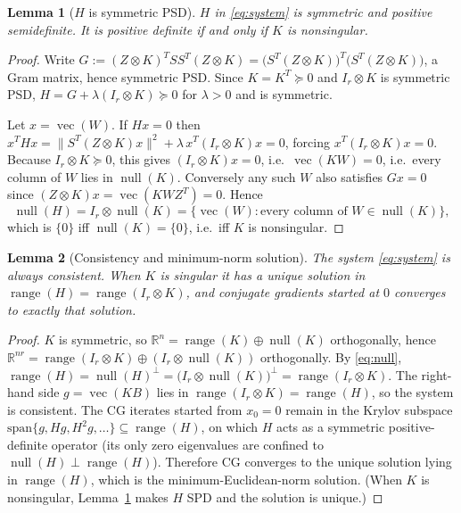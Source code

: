 \documentclass[12pt]{article}
\DeclareMathOperator{\vecop}{vec}
\DeclareMathOperator{\range}{range}
\DeclareMathOperator{\nullsp}{null}
\newcommand{\bR}{\mathbb{R}}
\newtheorem{lemma}{Lemma}
\begin{document}
\begin{lemma}[$H$ is symmetric PSD]\label{lem:psd}
$H$ in \eqref{eq:system} is symmetric and positive semidefinite. It is positive
definite if and only if $K$ is nonsingular.
\end{lemma}
\begin{proof}
Write $G:=(Z\otimes K)^{T}SS^{T}(Z\otimes K)=\big(S^{T}(Z\otimes K)\big)^{T}\big(S^{T}(Z\otimes K)\big)$,
a Gram matrix, hence symmetric PSD. Since $K=K^{T}\succeq0$ and $I_r\otimes K$ is
symmetric PSD, $H=G+\lambda(I_r\otimes K)\succeq0$ for $\lambda>0$ and is symmetric.

Let $x=\vecop(W)$. If $Hx=0$ then $x^{T}Hx=\|S^{T}(Z\otimes K)x\|^{2}+\lambda\,x^{T}(I_r\otimes K)x=0$,
forcing $x^{T}(I_r\otimes K)x=0$. Because $I_r\otimes K\succeq0$, this gives
$(I_r\otimes K)x=0$, i.e.\ $\vecop(KW)=0$, i.e.\ every column of $W$ lies in
$\nullsp(K)$. Conversely any such $W$ also satisfies $G x=0$ since
$(Z\otimes K)x=\vecop(KWZ^{T})=0$. Hence
\begin{equation}\label{eq:null}
  \nullsp(H)=I_r\otimes\nullsp(K)
  =\{\vecop(W): \text{every column of }W\in\nullsp(K)\},
\end{equation}
which is $\{0\}$ iff $\nullsp(K)=\{0\}$, i.e.\ iff $K$ is nonsingular.
\end{proof}

\begin{lemma}[Consistency and minimum-norm solution]\label{lem:consistent}
The system \eqref{eq:system} is always consistent. When $K$ is singular it has a
unique solution in $\range(H)=\range(I_r\otimes K)$, and conjugate gradients started
at $0$ converges to exactly that solution.
\end{lemma}
\begin{proof}
$K$ is symmetric, so $\bR^{n}=\range(K)\oplus\nullsp(K)$ orthogonally, hence
$\bR^{nr}=\range(I_r\otimes K)\oplus(I_r\otimes\nullsp(K))$ orthogonally. By
\eqref{eq:null}, $\range(H)=\nullsp(H)^{\perp}=\big(I_r\otimes\nullsp(K)\big)^{\perp}
=\range(I_r\otimes K)$. The right-hand side $g=\vecop(KB)$ lies in
$\range(I_r\otimes K)=\range(H)$, so the system is consistent. The CG iterates
started from $x_0=0$ remain in the Krylov subspace
$\mathrm{span}\{g,Hg,H^{2}g,\dots\}\subseteq\range(H)$, on which $H$ acts as a
symmetric positive-definite operator (its only zero eigenvalues are confined to
$\nullsp(H)\perp\range(H)$). Therefore CG converges to the unique solution lying in
$\range(H)$, which is the minimum-Euclidean-norm solution. (When $K$ is nonsingular,
Lemma~\ref{lem:psd} makes $H$ SPD and the solution is unique.)
\end{proof}
\end{document}
